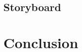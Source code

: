 \documentclass[a4paper,12pt]{book}
\theoremstyle{break}
\theoremstyle{break}
\theoremstyle{break}
\theoremstyle{break}
\theoremstyle{definition}
\theoremstyle{remark}
\begin{document}
    

\section{Storyboard}

\chapter{Conclusion}
\end{document}

